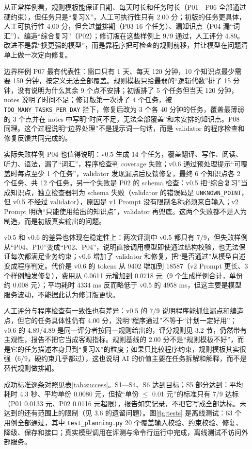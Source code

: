 \documentclass[UTF8,12pt,a4paper]{ctexart}
\begin{document}
从正常样例看，规则模板能保证日期、每天时长和任务时长（P01—P06 全部通过硬约束），但任务只是“复习X”，人工可执行性只有 2.00 分；初版的任务更具体，人工可执行性 4.00 分，但会过量排期（P03 16 个任务）、漏知识点（P04 漏“词汇”）、编造“综合复习”（P02）；修订版在这些样例上 9/9 通过，人工评分 4.89。改进不是靠“换更强的模型”，而是靠程序把可检查的规则前移，并让模型在问题清单上做一次定向修复。

边界样例 P07 最有代表性：窗口只有 1 天、每天 120 分钟，10 个知识点最少需要 150 分钟，按定义无法全部覆盖。规则模板只给最弱的“逻辑代数”排了 15 分钟，没有说明为什么其余 9 个点不安排；初版排了 5 个任务但当天 120 分钟，notes 说明了时间不足；修订版第一次排了 4 个任务，被 \texttt{TOO\_MANY\_TASKS\_PER\_DAY} 拦下，修复后改为 3 个各 40 分钟的任务，覆盖最薄弱的 3 个点并在 notes 中写明“时间不足，无法全部覆盖”和未安排的知识点。P08 同理。这个过程说明“边界处理”不是提示词一句话，而是 validator 的程序检查和修复反馈共同完成的。

实际失败样例 P04 也值得说明：v0.5 生成 14 个任务，覆盖翻译、写作、阅读、听力、语法，漏了“词汇”，程序检查判 coverage 失败；v0.6 通过预处理提示“可覆盖时每点至少 1 个任务”，validator 发现漏点后反馈修复，最终 6 个知识点各 2 个任务、共 12 个任务。另一个失败是 P02 的 schema 检查：v0.5 把“综合复习”当成知识点，独立检查器判为 schema 失败（validator 的错误码是 \texttt{UNKNOWN\_POINT}，但 v0.5 不经过 validator），原因是 v1 Prompt 没有限制名称必须来自输入；v2 Prompt 明确“只能使用给出的知识点”，validator 再兜底。这两个失败都不是人为制造，而是初版真实输出的问题。

v0.5 和 v0.6 的差异也体现在稳定性上：两次评测中 v0.5 都只有 7/9，但失败样例从“P04、P10”变成“P02、P04”，说明直接调用模型即使通过结构校验，也无法保证每次都满足业务约束；v0.6 增加了 validator 和修复，把“是否通过”从模型自述变成程序判定。代价是 v0.6 的 tokens 从 9402 增加到 18587（v2 Prompt 更长、3 个样例触发修复），费用从 0.0611 元增加到 0.0718 元（9 个生成样例合计，单份约 0.008 元）；平均耗时 4334 ms 反而略低于 v0.5 的 4958 ms，但这主要是模型服务波动，不能据此认为修订版更快。

人工评分与程序检查有一致性也有差异：v0.5 的 7/9 说明程序能抓住漏点和编造点，但它的任务具体性仍有 4.00 分，说明“程序通过”不等于“计划一定好用”；v0.6 的 4.89/4.89 是同一评分者按同一规则给出的，评分规则见 3.2 节，仍然带有主观性，报告不把它当成客观指标。规则基线的 2.00 分不是“规则模板不好”，而是它的任务描述本身只到“复习X”的粒度；如果只比较程序约束，规则模板其实很强（6/9，硬约束几乎都过），这也说明 AI 的价值主要在任务拆解和解释，而不是替代规则做排期。

成功标准逐条对照见表\ref{tab:success}。S1—S4、S6 达到目标；S5 部分达到：平均耗时 4.3 秒、平均单份 0.0080 元，但按“单份 $\le$ 0.01 元”的标准只有 7/9 达标（P01 0.0133 元、P02 0.0116 元超限），报告如实记录，不把它写成全部达标。未达到的还有范围上的限制（见 3.6 的遗留问题）。图\ref{fig:tests} 是离线测试：63 个用例全部通过，其中 \texttt{test\_planning.py} 20 个覆盖输入校验、约束校验、修复、降级、保存和接口；真实模型调用在评测与命令行运行中完成，离线测试不访问外部服务。
\end{document}
